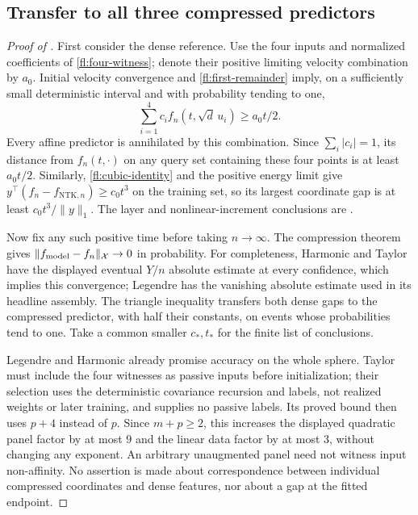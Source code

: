 \subsection{Transfer to all three compressed predictors}

\begin{proof}[Proof of ]
First consider the dense reference. Use the four inputs and normalized
coefficients of \eqref{fl:four-witness}; denote their positive limiting
velocity combination by $a_0$. Initial velocity convergence and
\eqref{fl:first-remainder} imply, on a sufficiently small deterministic
interval and with probability tending to one,
\[
 \sum_{i=1}^4c_i f_n(t,\sqrt d\,u_i)\ge a_0t/2.
\]
Every affine predictor is annihilated by this combination. Since
$\sum_i|c_i|=1$, its distance from $f_n(t,\cdot)$ on any query set
containing these four points is at least $a_0t/2$.
Similarly, \eqref{fl:cubic-identity} and the positive energy limit give
$y^\top(f_n-f_{\mathrm{NTK},n})\ge c_0t^3$ on the training set,
so its largest coordinate gap is at least $c_0t^3/\|y\|_1$.
The layer and nonlinear-increment conclusions are
.

Now fix any such positive time before taking $n\to\infty$.
The compression theorem gives
$\|f_{\rm model}-f_n\|_{\mathcal X}\to0$ in probability.
For completeness, Harmonic and Taylor have the displayed eventual
$Y/n$ absolute estimate at every confidence, which implies this convergence;
Legendre has the vanishing absolute estimate used in its headline assembly.
The triangle inequality transfers both dense gaps to the compressed
predictor, with half their constants, on events whose probabilities tend
to one. Take a common smaller $c_*,t_*$ for the finite list of conclusions.

Legendre and Harmonic already promise accuracy on the whole sphere. Taylor
must include the four witnesses as passive inputs before initialization;
their selection uses the deterministic covariance recursion and labels,
not realized weights or later training, and supplies no passive labels.
Its proved bound then uses $p+4$ instead of $p$. Since $m+p\ge2$,
this increases the displayed quadratic panel factor by at most $9$ and
the linear data factor by at most $3$, without changing any exponent.
An arbitrary unaugmented panel need not witness input non-affinity.
No assertion is made about correspondence between individual compressed
coordinates and dense features, nor about a gap at the fitted endpoint.
\end{proof}
